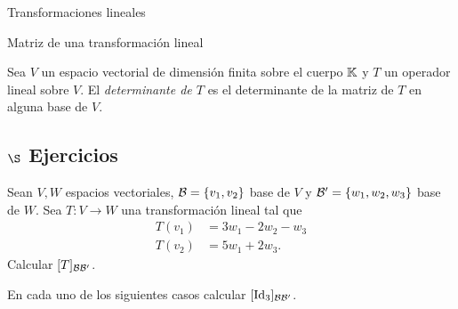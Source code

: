 \begin{chapter}{Transformaciones lineales}
\begin{section}{Matriz de una transformaci\'on lineal}
        \begin{definicion} 
                Sea $V$ un espacio vectorial de dimensión finita sobre el cuerpo $\mathbb K$ y $T$ un operador lineal sobre $V$. El \textit{determinante de $T$} es el determinante de la matriz de $T$ en alguna base de $V$.  
        \end{definicion}

        \subsection*{$\S$ Ejercicios}
        \begin{enumex}
             \item Sean $V,W$ espacios vectoriales, $\mathcal{B} =\{v_1,v_2\}$ base de $V$ y $\mathcal{B}' =\{w_1,w_2,w_3\}$ base de $W$. Sea $T:V \to W$ una transformación lineal tal que
            \begin{align*}
                T(v_1) &=  3w_1-2w_2 -w_3 \\
                T(v_2) &=  5w_1 +2w_3.
            \end{align*}
            Calcular $[T]_{\mathcal{B}\mathcal{B}'}$.
            \item  En cada uno  de los siguientes casos calcular $[\operatorname{Id}_3]_{\mathcal{B}\mathcal{B}'}$. 
\end{enumex}
\end{section}
\end{chapter}
